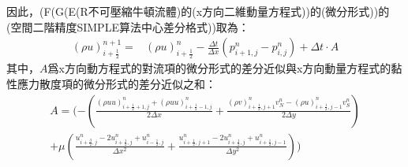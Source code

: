 \documentclass[12pt]{article}
\begin{document}
\noindent 因此，(F(G(E(R不可壓縮牛頓流體)的(x方向二維動量方程式))的(微分形式))的(空間二階精度SIMPLE算法中心差分格式))取為：\\
\begin{equation}\begin{split}
    (\rho u)_{i+\frac{1}{2}}^{n+1} =& (\rho u)_{i+\frac{1}{2}}^{n} - \frac{\Delta t}{\Delta x}(p_{i+1,j}^{n} - p_{i,j}^{n}) + \Delta t \cdot A
\end{split}\end{equation}
\noindent 其中，$A$爲x方向動方程式的對流項的微分形式的差分近似與x方向動量方程式的黏性應力散度項的微分形式的差分近似之和：\\
\begin{equation}\begin{split}
    A = (-\left(\frac{(\rho u u)_{i+\frac{1}{2}+1,j}^{n} + (\rho u u)_{i+\frac{1}{2}-1,j}^{n}}{2\Delta x} + \frac{(\rho v)_{i+\frac{1}{2},j+1}^{n}v_{N}^{n} - (\rho u )_{i+\frac{1}{2},j-1}^{n}v_{S}^{n}}{2\Delta y}\right)\\[1.5ex]
      +\mu\left(\frac{u_{i+\frac{3}{2},j}^{n}-2u_{i+\frac{1}{2},j}^{n}+u_{i-\frac{1}{2},j}^{n}}{\Delta x^{2}} + \frac{u_{i+\frac{1}{2},j+1}^{n}-2u_{i+\frac{1}{2},j}^{n}+u_{i+\frac{1}{2},j-1}^{n}}{\Delta y^{2}}\right))\\[1.5ex]
\end{split}\end{equation}
\end{document}
